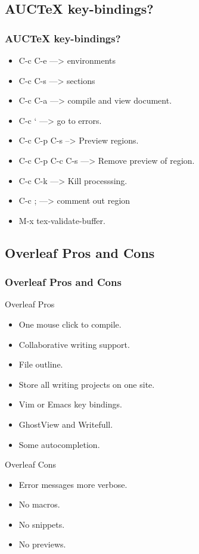 \documentclass{beamer}
\begin{document}
\subsection{AUCTeX key-bindings?}
\begin{frame}
\frametitle{AUCTeX key-bindings?}
\begin{center}
\begin{itemize}[font=$\bullet$\scshape\bfseries]
\item C-c C-e ---> environments
\item C-c C-s ---> sections
\item C-c C-a ---> compile and view document.
\item C-c ` ---> go to errors.
\item C-c C-p C-s --> Preview regions.
\item C-c C-p C-c C-s ---> Remove preview of region.
\item C-c C-k ---> Kill processsing.
\item C-c ; ---> comment out region
\item M-x tex-validate-buffer.
\end{itemize}
\end{center}
\end{frame}
\note{}


\subsection{Overleaf Pros and Cons}
\begin{frame}
\frametitle{Overleaf Pros and Cons}
\begin{Large}
\begin{center}
Overleaf Pros
\begin{itemize}[font=$\bullet$\scshape\bfseries]
\item One mouse click to compile.
\item Collaborative writing support.
\item File outline.
\item Store all writing projects on one site.
\item Vim or Emacs key bindings.
\item GhostView and Writefull.
\item Some autocompletion.
\end{itemize}
Overleaf Cons
\begin{itemize}[font=$\bullet$\scshape\bfseries]
\item Error messages more verbose.
\item No macros.
\item No snippets.
\item No previews.
\end{itemize}
\end{center}
\end{Large}
\end{frame}
\note{}
\end{document}
